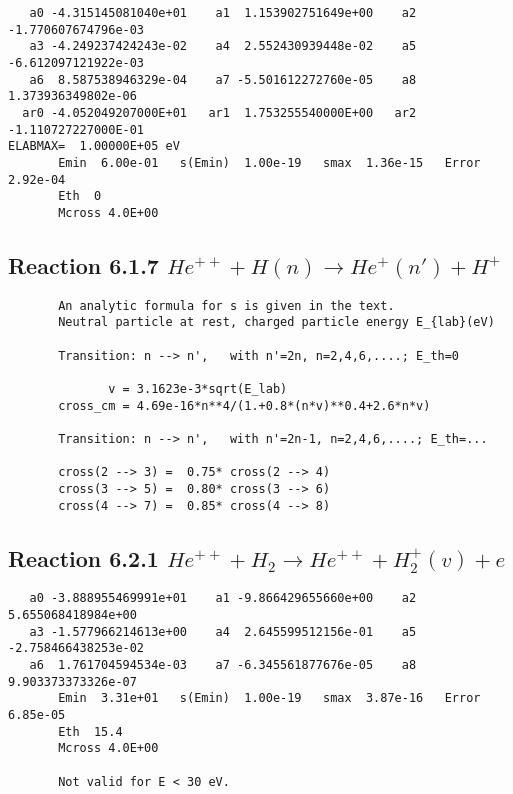\documentclass[12pt,dvipdfmx]{article}
\begin{document}
\begin{small}\begin{verbatim}
   a0 -4.315145081040e+01    a1  1.153902751649e+00    a2 -1.770607674796e-03
   a3 -4.249237424243e-02    a4  2.552430939448e-02    a5 -6.612097121922e-03
   a6  8.587538946329e-04    a7 -5.501612272760e-05    a8  1.373936349802e-06
  ar0 -4.052049207000E+01   ar1  1.753255540000E+00   ar2 -1.110727227000E-01
ELABMAX=  1.00000E+05 eV
       Emin  6.00e-01   s(Emin)  1.00e-19   smax  1.36e-15   Error  2.92e-04
       Eth  0
       Mcross 4.0E+00
\end{verbatim}\end{small}

\newpage
\subsection{
Reaction 6.1.7 $   He^{++} + H(n) \rightarrow  He^+(n') + H^+$}

\begin{small}\begin{verbatim}
       An analytic formula for s is given in the text.
       Neutral particle at rest, charged particle energy E_{lab}(eV)

       Transition: n --> n',   with n'=2n, n=2,4,6,....; E_th=0

              v = 3.1623e-3*sqrt(E_lab)
       cross_cm = 4.69e-16*n**4/(1.+0.8*(n*v)**0.4+2.6*n*v)

       Transition: n --> n',   with n'=2n-1, n=2,4,6,....; E_th=...

       cross(2 --> 3) =  0.75* cross(2 --> 4)
       cross(3 --> 5) =  0.80* cross(3 --> 6)
       cross(4 --> 7) =  0.85* cross(4 --> 8)
\end{verbatim}\end{small}

\newpage
\subsection{
Reaction 6.2.1 $   He^{++} + H_2 \rightarrow He^{++} + H_2^+(v) + e$}


\begin{small}\begin{verbatim}
   a0 -3.888955469991e+01    a1 -9.866429655660e+00    a2  5.655068418984e+00
   a3 -1.577966214613e+00    a4  2.645599512156e-01    a5 -2.758466438253e-02
   a6  1.761704594534e-03    a7 -6.345561877676e-05    a8  9.903373373326e-07
       Emin  3.31e+01   s(Emin)  1.00e-19   smax  3.87e-16   Error  6.85e-05
       Eth  15.4
       Mcross 4.0E+00

       Not valid for E < 30 eV.
\end{verbatim}\end{small}
\end{document}
